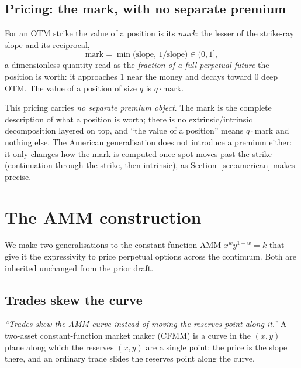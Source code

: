 \documentclass[11pt]{article}
\begin{document}
\subsection{Pricing: the mark, with no separate premium}
For an OTM strike the value of a position is its \emph{mark}: the lesser of the
strike-ray slope and its reciprocal,
\begin{equation}
  \mathrm{mark}=\min\!\bigl(\mathrm{slope},\,1/\mathrm{slope}\bigr)\in(0,1],
  \label{eq:mark}
\end{equation}
a dimensionless quantity read as the \emph{fraction of a full perpetual future}
the position is worth: it approaches $1$ near the money and decays toward $0$
deep OTM. The value of a position of size $q$ is $q\cdot\mathrm{mark}$.

This pricing carries \emph{no separate premium object}. The mark is the complete
description of what a position is worth; there is no extrinsic/intrinsic
decomposition layered on top, and ``the value of a position'' means
$q\cdot\mathrm{mark}$ and nothing else. The American generalisation does not
introduce a premium either: it only changes how the mark is computed once spot
moves past the strike (continuation through the strike, then intrinsic), as
Section~\ref{sec:american} makes precise.

\section{The AMM construction}\label{sec:amm}

We make two generalisations to the constant-function AMM $x^{w}y^{1-w}=k$ that
give it the expressivity to price perpetual options across the continuum. Both
are inherited unchanged from the prior draft.

\subsection{Trades skew the curve}
\emph{``Trades skew the AMM curve instead of moving the reserves point along
it.''} A two-asset constant-function market maker (CFMM) is a curve in the
$(x,y)$ plane along which the reserves $(x,y)$ are a single point; the price is
the slope there, and an ordinary trade slides the reserves point along the curve.
\end{document}
